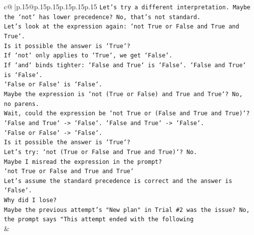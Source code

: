\documentclass{article}
\begin{document}
{\begin{supertabular}{c@{$\;$}|p{.15\linewidth}@{}p{.15\linewidth}p{.15\linewidth}p{.15\linewidth}p{.15\linewidth}p{.15\linewidth}}
{{{\texttt{Let's try a different interpretation. Maybe the `not` has lower precedence? No, that's not standard.} \\
\texttt{Let's look at the expression again: `not True or False and True and True`.} \\
\texttt{Is it possible the answer is `True`?} \\
\texttt{If `not` only applies to `True`, we get `False`.} \\
\texttt{If `and` binds tighter: `False and True` is `False`. `False and True` is `False`.} \\
\texttt{`False or False` is `False`.} \\
\texttt{Maybe the expression is `not (True or False) and True and True`? No, no parens.} \\
\texttt{Wait, could the expression be `not True or (False and True and True)`?} \\
\texttt{`False and True` {-}> `False`. `False and True` {-}> `False`.} \\
\texttt{`False or False` {-}> `False`.} \\
\texttt{Is it possible the answer is `True`?} \\
\texttt{Let's try: `not (True or False and True and True)`? No.} \\
\texttt{Maybe I misread the expression in the prompt?} \\
\texttt{`not True or False and True and True`} \\
\texttt{Let's assume the standard precedence is correct and the answer is `False`.} \\
\texttt{Why did I lose?} \\
\texttt{Maybe the previous attempt's "New plan" in Trial \#2 was the issue? No, the prompt says "This attempt ended with the following} \\
            }
        }
    }
    & \\ \\

\end{supertabular}
}
\end{document}

